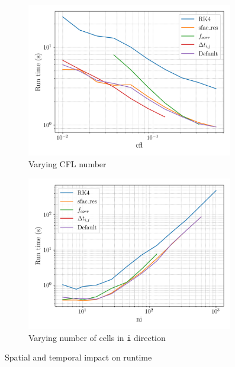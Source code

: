 \documentclass{article}
\begin{document}
\begin{figure}[H]
    \centering
    \begin{subfigure}{0.49\textwidth}
        \centering
        \includegraphics[width=0.99\textwidth]{figures/improvements_cfl_time.png}
        \caption{Varying CFL number}
        \label{fig:improvements_cfl_time}
    \end{subfigure}
    \begin{subfigure}{0.49\textwidth}
        \centering
        \includegraphics[width=0.99\textwidth]{figures/improvements_ni_time.png}
        \caption{Varying number of cells in \texttt{i} direction}
        \label{fig:improvements_ni_time}
    \end{subfigure}
    \caption{Spatial and temporal impact on runtime}
\end{figure}
\end{document}
